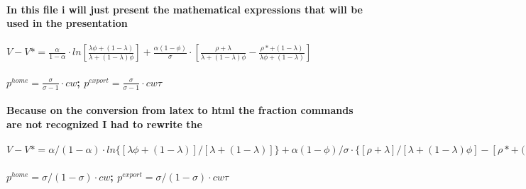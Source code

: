 \documentclass{article}
\begin{document}
\paragraph{In this file i will just present the mathematical expressions that will be used in the presentation}
\paragraph{\(V-V*=\frac{\alpha}{1-\alpha}\cdot ln[\frac{\lambda\phi+(1-\lambda)}{\lambda+(1-\lambda)\phi}]+\frac{\alpha(1-\phi)}{\sigma}\cdot[\frac{\rho+\lambda}{\lambda+(1-\lambda)\phi}-\frac{\rho*+(1-\lambda)}{\lambda\phi+(1-\lambda)}]\)}

\paragraph{\(p^{home}=\frac{\sigma}{\sigma-1}\cdot cw\); \(p^{export}=\frac{\sigma}{\sigma-1}\cdot cw\tau\) }

\paragraph{Because on the conversion from latex to html the fraction commands are not recognized I had to rewrite the }

\paragraph{\(V-V*=\alpha/(1-\alpha)\cdot ln\{[\lambda\phi+(1-\lambda)]/[\lambda+(1-\lambda)]\}+\alpha(1-\phi)/\sigma\cdot\{[\rho+\lambda]/[\lambda+(1-\lambda)\phi]-[\rho*+(1-\lambda)]/[\lambda\phi+(1-\lambda)]\} \)}

\paragraph{\(p^{home}=\sigma/(1-\sigma)\cdot cw\); \(p^{export}=\sigma/(1-\sigma)\cdot cw\tau\) }
\end{document}

